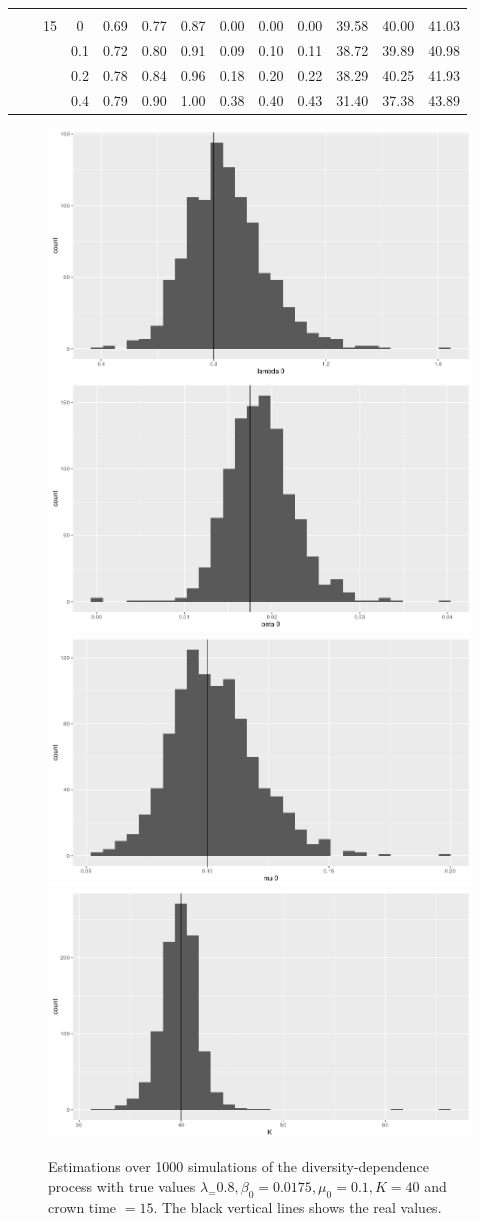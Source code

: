 \documentclass[]{article}
\begin{document}
\begin{table}[h!]
\begin{tabular}{cccc|ccc@{\hskip 0.3in}ccc@{\hskip 0.3in}ccc}
          &       &              &       &        &         &       &       &      &      &       &       &        \\
          &       & 15           & 0     & 0.69   & 0.77    & 0.87  & 0.00  & 0.00 & 0.00 & 39.58 & 40.00 & 41.03  \\
          &       &              & 0.1   & 0.72   & 0.80    & 0.91  & 0.09  & 0.10 & 0.11 & 38.72 & 39.89 & 40.98  \\
          &       &              & 0.2   & 0.78   & 0.84    & 0.96  & 0.18  & 0.20 & 0.22 & 38.29 & 40.25 & 41.93  \\
          &       &              & 0.4   & 0.79   & 0.90    & 1.00  & 0.38  & 0.40 & 0.43 & 31.40 & 37.38 & 43.89 
\end{tabular}
\end{table}



 \begin{figure}[h]
\includegraphics[width=.5\textwidth]{lambda.png}
\includegraphics[width=.5\textwidth]{beta.png}
\includegraphics[width=.5\textwidth]{mu.png}
\includegraphics[width=.5\textwidth]{K.png}
\label{hists}
\caption{Estimations over 1000 simulations of the diversity-dependence process with true values $\lambda_ = 0.8, \beta_0 = 0.0175, \mu_0 = 0.1, K=40$ and crown time $=15$. The black vertical lines shows the real values.}
\end{figure}
\end{document}
